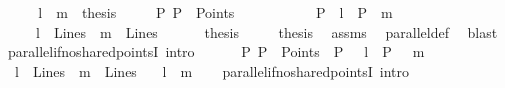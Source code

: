 \begin{isabellebody}
%
\isadelimproof
%
\endisadelimproof
%
\isatagproof
{}\isamarkupfalse%
\ {\isacharminus}{\kern0pt}\isanewline
\ \ \isamarkupfalse%
\ {\isachardoublequoteopen}{\isacharparenleft}{\kern0pt}l\ {\isacharequal}{\kern0pt}\ m\ {\isasymLongrightarrow}\ thesis{\isacharparenright}{\kern0pt}\ {\isasymLongrightarrow}\isanewline
\ \ \ \ {\isacharparenleft}{\kern0pt}{\isacharparenleft}{\kern0pt}{\isasymnexists}P{\isachardot}{\kern0pt}\ P\ {\isasymin}\ Points\ {\isasymand}\isanewline
\ \ \ \ \ \ \ \ \ \ P\ {\isasymlhd}\ l\ {\isasymand}\ P\ {\isasymlhd}\ m{\isacharparenright}{\kern0pt}\ {\isasymand}\isanewline
\ \ \ \ \ l\ {\isasymin}\ Lines\ {\isasymand}\ m\ {\isasymin}\ Lines\ {\isasymLongrightarrow}\isanewline
\ \ \ \ \ thesis{\isacharparenright}{\kern0pt}\ {\isasymLongrightarrow}\isanewline
\ \ \ \ thesis{\isachardoublequoteclose}\ \isamarkupfalse%
\ assms\ \isamarkupfalse%
\ parallel{\isacharunderscore}{\kern0pt}def\ \isamarkupfalse%
\ blast\isanewline
{}\isamarkupfalse%
%
\endisatagproof
{\isafoldproof}%
%
\isadelimproof
\isanewline
%
\endisadelimproof
\isanewline
{}\isamarkupfalse%
\ parallel{\isacharunderscore}{\kern0pt}if{\isacharunderscore}{\kern0pt}no{\isacharunderscore}{\kern0pt}shared{\isacharunderscore}{\kern0pt}pointsI\ {\isacharbrackleft}{\kern0pt}intro{\isacharbrackright}{\kern0pt}{\isacharcolon}{\kern0pt}\isanewline
\ \ \ {\isachardoublequoteopen}\ {\isasymnot}\ {\isacharparenleft}{\kern0pt}{\isasymexists}\ P{\isachardot}{\kern0pt}\ P\ {\isasymin}\ Points\ {\isasymand}\ P\ {\isasymlhd}\ \ l\ {\isasymand}\ P\ {\isasymlhd}\ \ m{\isacharparenright}{\kern0pt}{\isachardoublequoteclose}\ \isanewline
\ \ {\isachardoublequoteopen}l\ {\isasymin}\ Lines{\isachardoublequoteclose}\ \ {\isachardoublequoteopen}m\ {\isasymin}\ Lines{\isachardoublequoteclose}\isanewline
\ \ \ {\isachardoublequoteopen}l\ {\isacharbar}{\kern0pt}{\isacharbar}{\kern0pt}\ m{\isachardoublequoteclose}\isanewline
%
\isadelimproof
\ \ %
\endisadelimproof
%
\isatagproof
{}\isamarkupfalse%
%
\endisatagproof
{\isafoldproof}%
%
\isadelimproof
\isanewline
%
\endisadelimproof
\isanewline
{}\isamarkupfalse%
\ parallel{\isacharunderscore}{\kern0pt}if{\isacharunderscore}{\kern0pt}no{\isacharunderscore}{\kern0pt}shared{\isacharunderscore}{\kern0pt}points{}I\ {\isacharbrackleft}{\kern0pt}intro{\isacharbrackright}{\kern0pt}{\isacharcolon}{\kern0pt}\isanewline

\end{isabellebody}
